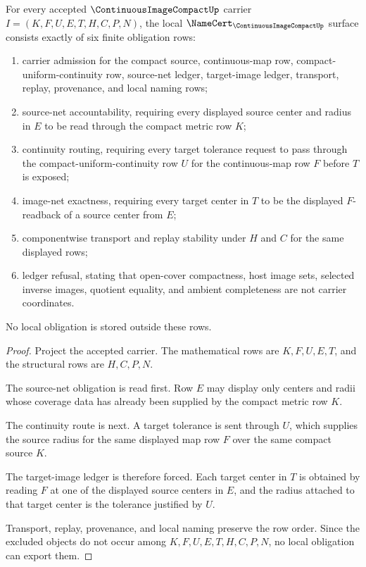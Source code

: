 \begin{theorem}
\label{thm:continuous-image-compact-namecert-obligations}
For every accepted $\ContinuousImageCompactUp$ carrier $I=(K,F,U,E,T,H,C,P,N)$, the local $\NameCert_{\ContinuousImageCompactUp}$ surface consists exactly of six finite obligation rows:
\begin{enumerate}
\item carrier admission for the compact source, continuous-map row, compact-uniform-continuity row, source-net ledger, target-image ledger, transport, replay, provenance, and local naming rows;
\item source-net accountability, requiring every displayed source center and radius in $E$ to be read through the compact metric row $K$;
\item continuity routing, requiring every target tolerance request to pass through the compact-uniform-continuity row $U$ for the continuous-map row $F$ before $T$ is exposed;
\item image-net exactness, requiring every target center in $T$ to be the displayed $F$-readback of a source center from $E$;
\item componentwise transport and replay stability under $H$ and $C$ for the same displayed rows;
\item ledger refusal, stating that open-cover compactness, host image sets, selected inverse images, quotient equality, and ambient completeness are not carrier coordinates.
\end{enumerate}
No local obligation is stored outside these rows.
\end{theorem}
\begin{proof}
Project the accepted carrier. The mathematical rows are $K,F,U,E,T$, and the structural rows are $H,C,P,N$.

The source-net obligation is read first. Row $E$ may display only centers and radii whose coverage data has already been supplied by the compact metric row $K$.

The continuity route is next. A target tolerance is sent through $U$, which supplies the source radius for the same displayed map row $F$ over the same compact source $K$.

The target-image ledger is therefore forced. Each target center in $T$ is obtained by reading $F$ at one of the displayed source centers in $E$, and the radius attached to that target center is the tolerance justified by $U$.

Transport, replay, provenance, and local naming preserve the row order. Since the excluded objects do not occur among $K,F,U,E,T,H,C,P,N$, no local obligation can export them.
\end{proof}

